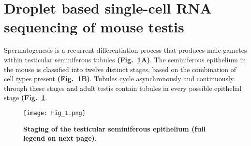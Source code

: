 
\section{Droplet based single-cell RNA sequencing of mouse testis}
\label{sec3:clustering}

Spermatogenesis is a recurrent differentiation process that produces male gametes within testicular seminiferous tubules \textbf{(Fig.~\ref{fig3:cell_staging}A)}. The seminiferous epithelium in the mouse is classified into twelve distinct stages, based on the combination of cell types present \textbf{(Fig.~\ref{fig3:cell_staging}B)}. Tubules cycle asynchronously and continuously through these stages and adult testis contain tubules in every possible epithelial stage \textbf{(Fig.~\ref{fig3:cell_staging}}. \\

\begin{figure}[!h]
\centering
\texttt{[image: Fig\_1.png]}
\caption[Staging of the testicular seminiferous epithelium]{\textbf{Staging of the testicular seminiferous epithelium (full legend on next page).}\\}
\label{fig3:cell_staging}
\end{figure}

\newpage

